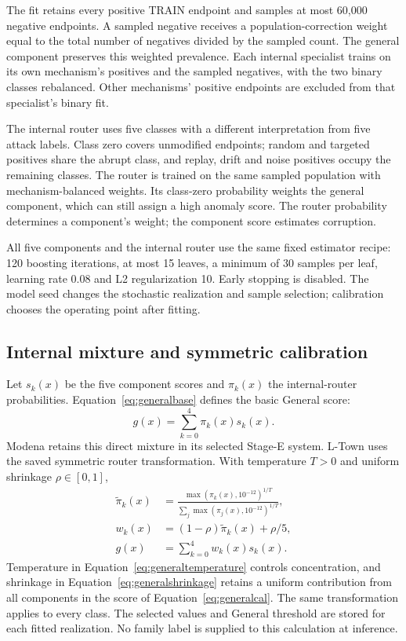 The fit retains every positive TRAIN endpoint and samples at most 60,000 negative endpoints. A sampled negative receives a population-correction weight equal to the total number of negatives divided by the sampled count. The general component preserves this weighted prevalence. Each internal specialist trains on its own mechanism's positives and the sampled negatives, with the two binary classes rebalanced. Other mechanisms' positive endpoints are excluded from that specialist's binary fit.

The internal router uses five classes with a different interpretation from five attack labels. Class zero covers unmodified endpoints; random and targeted positives share the abrupt class, and replay, drift and noise positives occupy the remaining classes. The router is trained on the same sampled population with mechanism-balanced weights. Its class-zero probability weights the general component, which can still assign a high anomaly score. The router probability determines a component's weight; the component score estimates corruption.

All five components and the internal router use the same fixed estimator recipe: 120 boosting iterations, at most 15 leaves, a minimum of 30 samples per leaf, learning rate 0.08 and L2 regularization 10. Early stopping is disabled. The model seed changes the stochastic realization and sample selection; calibration chooses the operating point after fitting.

\subsection{Internal mixture and symmetric calibration}
Let $s_k(x)$ be the five component scores and $\pi_k(x)$ the internal-router probabilities. Equation~\eqref{eq:generalbase} defines the basic General score:
\begin{equation}
 g(x)=\sum_{k=0}^{4}\pi_k(x)s_k(x).\label{eq:generalbase}
\end{equation}
Modena retains this direct mixture in its selected Stage-E system. L-Town uses the saved symmetric router transformation. With temperature $T>0$ and uniform shrinkage $\rho\in[0,1]$,
\begin{align}
 \widetilde\pi_k(x)&=\frac{\max(\pi_k(x),10^{-12})^{1/T}}
 {\sum_j\max(\pi_j(x),10^{-12})^{1/T}},\label{eq:generaltemperature}\\
 w_k(x)&=(1-\rho)\widetilde\pi_k(x)+\rho/5,\label{eq:generalshrinkage}\\
 g(x)&=\sum_{k=0}^{4}w_k(x)s_k(x).
 \label{eq:generalcal}
\end{align}
Temperature in Equation~\eqref{eq:generaltemperature} controls concentration, and shrinkage in Equation~\eqref{eq:generalshrinkage} retains a uniform contribution from all components in the score of Equation~\eqref{eq:generalcal}. The same transformation applies to every class. The selected values and General threshold are stored for each fitted realization. No family label is supplied to this calculation at inference.

